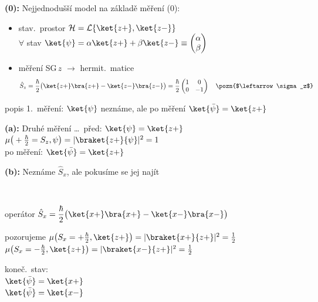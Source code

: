 \documentclass[11pt,a4paper]{article}
\begin{document}
\textbf{(0):} Nejjednodušší model na základě měření (0):
\begin{itemize}
  \item stav.\ prostor $\mathcal{H} = \mathcal{L}\{\ket{z+},\ket{z-}\}$
         \\
        $\forall$ stav \quad $\ket{\psi} = \alpha\ket{z+} + \beta\ket{z-} \equiv \begin{pmatrix}\alpha\\ \beta\end{pmatrix}$
  \item měření SG\,$z$ $\to$ hermit.\ matice
  \[
    \hat S_z = \frac{\hbar}{2}\big(\ket{z+}\bra{z+} - \ket{z-}\bra{z-}\big) = \frac{\hbar}{2}\begin{pmatrix}1&0\\0&-1\end{pmatrix}
    \quad \pozn{$\leftarrow\sigma_z$}
  \]
\end{itemize}
popis 1.\ měření: $\ket{\psi}$ neznáme, ale po měření $\ket{\bar\psi} = \ket{z+}$

\textbf{(a):} Druhé měření \dots\ před: $\ket{\psi} = \ket{z+}$ \quad {} \\
\quad $\mu\big(+\tfrac{\hbar}{2} = S_z, \psi\big) = |\braket{z+}{\psi}|^2 = 1$ \\
\quad po měření: \quad $\ket{\bar\psi} = \ket{z+}$

\textbf{(b):} Neznáme $\hat S_x$, ale pokusíme se jej najít

 \\

operátor \quad $\hat S_x = \dfrac{\hbar}{2}\big(\ket{x+}\bra{x+} - \ket{x-}\bra{x-}\big)$

\begin{minipage}{0.68\textwidth}
pozorujeme \quad $\mu\big(S_x = +\tfrac{\hbar}{2}, \ket{z+}\big) = |\braket{x+}{z+}|^2 = \tfrac12$ \\
\phantom{pozorujeme} \quad $\mu\big(S_x = -\tfrac{\hbar}{2}, \ket{z+}\big) = |\braket{x-}{z+}|^2 = \tfrac12$
\end{minipage}
\begin{minipage}{0.3\textwidth}
koneč.\ stav: \\ $\ket{\bar\psi} = \ket{x+}$ \\ $\ket{\bar\psi} = \ket{x-}$
\end{minipage}
\end{document}
